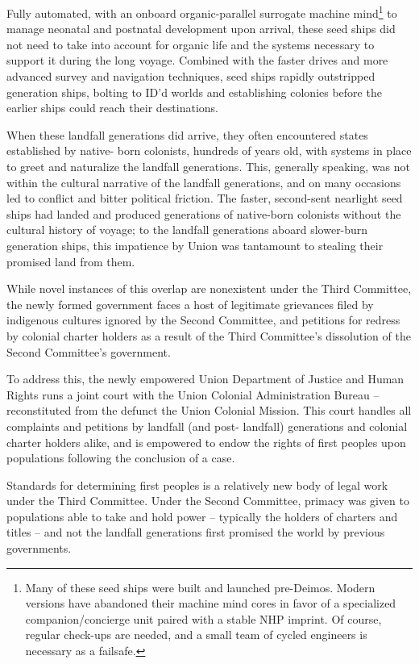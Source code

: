 Fully automated, with an onboard organic-parallel surrogate machine mind\footnote{Many of these seed ships were built and launched pre-Deimos. Modern versions have abandoned their
machine mind cores in favor of a specialized companion/concierge unit paired with a stable NHP imprint. Of
course, regular check-ups are needed, and a small team of cycled engineers is necessary as a failsafe.} to manage neonatal
and postnatal development upon arrival, these seed ships did not need to take into account for
organic life and the systems necessary to support it during the long voyage. Combined with the
faster drives and more advanced survey and navigation techniques, seed ships rapidly
outstripped generation ships, bolting to ID’d worlds and establishing colonies before the earlier
ships could reach their destinations.

When these landfall generations did arrive, they often encountered states established by native-
born colonists, hundreds of years old, with systems in place to greet and naturalize the landfall
generations. This, generally speaking, was not within the cultural narrative of the landfall
generations, and on many occasions led to conflict and bitter political friction. The faster,
second-sent nearlight seed ships had landed and produced generations of native-born colonists
without the cultural history of voyage; to the landfall generations aboard slower-burn generation
ships, this impatience by Union was tantamount to stealing their promised land from them.

While novel instances of this overlap are nonexistent under the Third Committee, the newly
formed government faces a host of legitimate grievances filed by indigenous cultures ignored by
the Second Committee, and petitions for redress by colonial charter holders as a result of the
Third Committee’s dissolution of the Second Committee’s government.

To address this, the newly empowered Union Department of Justice and Human Rights runs a
joint court with the Union Colonial Administration Bureau -- reconstituted from the defunct the
Union Colonial Mission. This court handles all complaints and petitions by landfall (and post-
landfall) generations and colonial charter holders alike, and is empowered to endow the rights of
first peoples upon populations following the conclusion of a case.

Standards for determining first peoples is a relatively new body of legal work under the Third
Committee. Under the Second Committee, primacy was given to populations able to take and
hold power -- typically the holders of charters and titles -- and not the landfall generations first
promised the world by previous governments.

